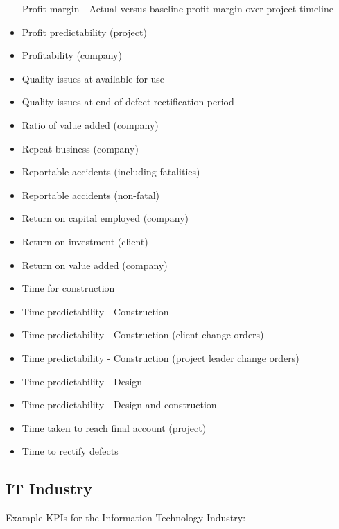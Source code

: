 \documentclass[]{book}
\begin{document}
\begin{itemize}
  Profit margin - Actual versus baseline profit margin over project
  timeline
\item
  Profit predictability (project)
\item
  Profitability (company)
\item
  Quality issues at available for use
\item
  Quality issues at end of defect rectification period
\item
  Ratio of value added (company)
\item
  Repeat business (company)
\item
  Reportable accidents (including fatalities)
\item
  Reportable accidents (non-fatal)
\item
  Return on capital employed (company)
\item
  Return on investment (client)
\item
  Return on value added (company)
\item
  Time for construction
\item
  Time predictability - Construction
\item
  Time predictability - Construction (client change orders)
\item
  Time predictability - Construction (project leader change orders)
\item
  Time predictability - Design
\item
  Time predictability - Design and construction
\item
  Time taken to reach final account (project)
\item
  Time to rectify defects
\end{itemize}

\subsection{IT Industry}\label{it-industry}

Example KPIs for the Information Technology Industry:
\end{document}
